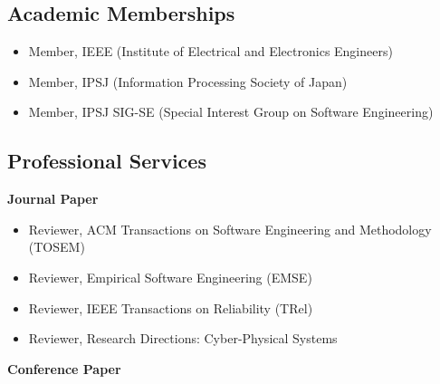 \documentclass[11pt,a4paper]{moderncv}        %
\newcommand{\subsubsection}[1]{%
  \par\vspace{0.5em}%
  {\color{color1}\bfseries #1}%
  \par\vspace{0.25em}%
}
\begin{document}
\subsection{Academic Memberships}
\begin{itemize}
  \item Member, IEEE (Institute of Electrical and Electronics Engineers) \hfill  
  \item Member, IPSJ (Information Processing Society of Japan)
  \item Member, IPSJ SIG-SE (Special Interest Group on Software Engineering)
\end{itemize}

\subsection{Professional Services}

\subsubsection{Journal Paper}

\begin{itemize}
    \item Reviewer, ACM Transactions on Software Engineering and Methodology (TOSEM)
    \item Reviewer, Empirical Software Engineering (EMSE)
    \item Reviewer, IEEE Transactions on Reliability (TRel)
    \item Reviewer, Research Directions: Cyber-Physical Systems
\end{itemize}

\subsubsection{Conference Paper}
\end{document}

